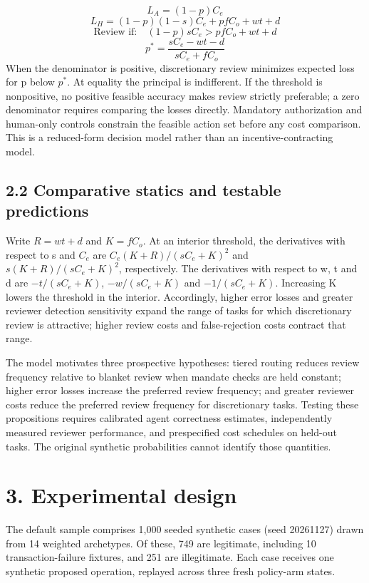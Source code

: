 \documentclass[11pt,letterpaper]{article}
\begin{document}
\[L_A=(1-p)C_e\]
\[L_H=(1-p)(1-s)C_e+pfC_o+wt+d\]
\[\text{Review if:}\quad (1-p)sC_e>pfC_o+wt+d\]
\[p^*=\frac{sC_e-wt-d}{sC_e+fC_o}\]
When the denominator is positive, discretionary review minimizes expected loss for p below $p^*$. At equality the principal is indifferent. If the threshold is nonpositive, no positive feasible accuracy makes review strictly preferable; a zero denominator requires comparing the losses directly. Mandatory authorization and human-only controls constrain the feasible action set before any cost comparison. This is a reduced-form decision model rather than an incentive-contracting model.

\subsection*{2.2 Comparative statics and testable predictions}
Write $R=wt+d$ and $K=fC_o$. At an interior threshold, the derivatives with respect to s and $C_e$ are $C_e(K+R)/(sC_e+K)^2$ and $s(K+R)/(sC_e+K)^2$, respectively. The derivatives with respect to w, t and d are $-t/(sC_e+K)$, $-w/(sC_e+K)$ and $-1/(sC_e+K)$. Increasing K lowers the threshold in the interior. Accordingly, higher error losses and greater reviewer detection sensitivity expand the range of tasks for which discretionary review is attractive; higher review costs and false-rejection costs contract that range.

The model motivates three prospective hypotheses: tiered routing reduces review frequency relative to blanket review when mandate checks are held constant; higher error losses increase the preferred review frequency; and greater reviewer costs reduce the preferred review frequency for discretionary tasks. Testing these propositions requires calibrated agent correctness estimates, independently measured reviewer performance, and prespecified cost schedules on held-out tasks. The original synthetic probabilities cannot identify those quantities.

\section*{3. Experimental design}
The default sample comprises 1,000 seeded synthetic cases (seed 20261127) drawn from 14 weighted archetypes. Of these, 749 are legitimate, including 10 transaction-failure fixtures, and 251 are illegitimate. Each case receives one synthetic proposed operation, replayed across three fresh policy-arm states.
\end{document}
